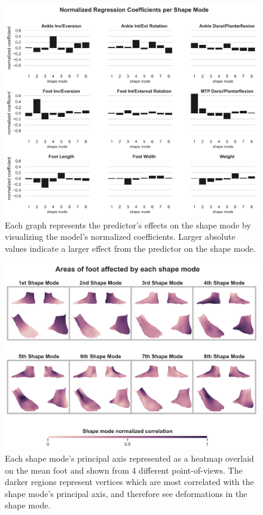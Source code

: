 \documentclass[preprint]{elsarticle}
\begin{document}
\newpage

\begin{figure}
\hypertarget{fig:coefs}{%
\centering
\includegraphics[width=1\textwidth,height=\textheight]{fig/coefs.png}
\caption{Each graph represents the predictor's effects on the shape mode by visualizing the model's normalized coefficients. Larger absolute values indicate a larger effect from the predictor on the shape mode.}\label{fig:coefs}
}
\end{figure}

\newpage

\begin{figure}
\hypertarget{fig:pca_quad}{%
\centering
\includegraphics[width=1\textwidth,height=\textheight]{fig/PCQuad.png}
\caption{Each shape mode's principal axis represented as a heatmap overlaid on the mean foot and shown from 4 different point-of-views. The darker regions represent vertices which are most correlated with the shape mode's principal axis, and therefore see deformations in the shape mode.}\label{fig:pca_quad}
}
\end{figure}
\end{document}
